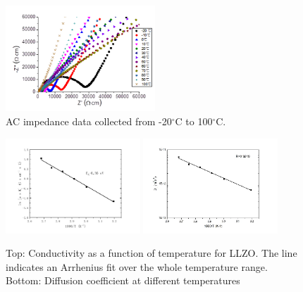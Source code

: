 \documentclass[twoside,twocolumn,9pt]{article}
\begin{document}
\begin{figure}[t]
\centering
\includegraphics[width=0.5\textwidth]{Pics/impedance.png}
\caption{AC impedance data collected from -20$^\circ$C to 100$^\circ$C.}
\label{fig:impedance}
\end{figure}

\begin{figure}[t]
\centering
\includegraphics[width=0.45\textwidth]{Pics/arrhenius-plot.png}
\includegraphics[width=0.45\textwidth]{Pics/DiffusionCoefficient.png}
\caption{Top: Conductivity as a function of temperature for LLZO. The line indicates an Arrhenius fit over the whole temperature range. Bottom: Diffusion coefficient at different temperatures}
\label{fig:arrhenius-plot}
\end{figure}
\end{document}
